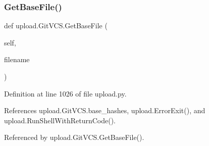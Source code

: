 \subsubsection{\texorpdfstring{Get\+Base\+File()}{GetBaseFile()}\hspace{0.1cm}{\footnotesize\ttfamily [2/2]}}
{\footnotesize\ttfamily def upload.\+Git\+V\+C\+S.\+Get\+Base\+File (\begin{DoxyParamCaption}\item[{}]{self,  }\item[{}]{filename }\end{DoxyParamCaption})}



Definition at line 1026 of file upload.\+py.



References upload.\+Git\+V\+C\+S.\+base\+\_\+hashes, upload.\+Error\+Exit(), and upload.\+Run\+Shell\+With\+Return\+Code().



Referenced by upload.\+Git\+V\+C\+S.\+Get\+Base\+File().


